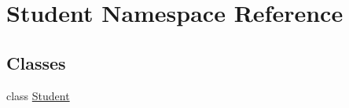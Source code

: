 \hypertarget{namespace_student}{}\section{Student Namespace Reference}
\label{namespace_student}
\subsection*{Classes}
\begin{DoxyCompactItemize}
\item 
class \hyperlink{class_student_1_1_student}{Student}
\end{DoxyCompactItemize}

